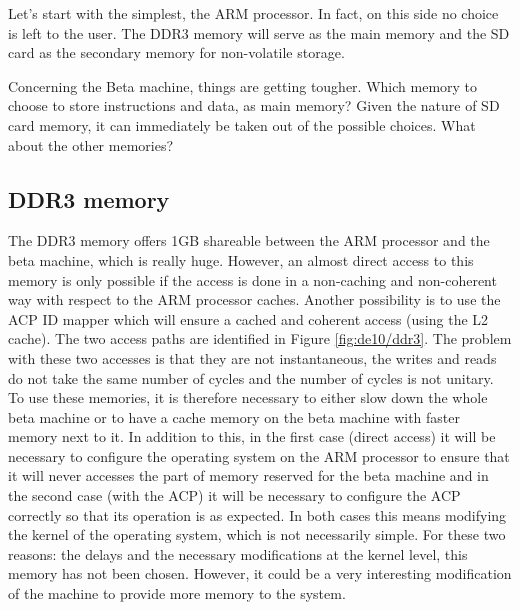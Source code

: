 Let's start with the simplest, the ARM processor. In fact, on this side no choice is left to the 
user. The DDR3 memory will serve as the main memory and the SD card as the secondary memory for 
non-volatile storage. 

Concerning the Beta machine, things are getting tougher.  Which memory to choose to store 
instructions and data, as main memory? Given the nature of SD card memory, it can immediately be 
taken out of the possible choices. What about the other memories?

\subsection{DDR3 memory}

The DDR3 memory offers 1GB 
shareable between the ARM processor and the beta machine, which is really huge. However, an almost 
direct access to this memory is only possible if the access is done in a non-caching and 
non-coherent way with respect to the ARM processor caches. Another possibility is to use the ACP 
ID mapper which will ensure a cached and coherent access (using the L2 cache). The two access paths 
are identified in Figure \ref{fig:de10/ddr3}. The problem with these two accesses is that they are 
not instantaneous, the writes and reads do not take the same number of cycles and the number of 
cycles is not unitary. To use these memories, it is therefore necessary to either slow down the 
whole beta machine or to have a cache memory on the beta machine with faster memory next to it. In 
addition to this, in the first case (direct access) it will be necessary to configure the operating 
system on the ARM processor to ensure that it will never accesses the part of memory reserved for the
beta machine and in the second case (with the ACP) it will be necessary to configure the ACP 
correctly so that its operation is as expected. In both cases this means modifying the kernel of the 
operating system, which is not necessarily simple. For these two reasons: the delays and the 
necessary modifications at the kernel level, this memory has not been chosen. However, it could be 
a very interesting modification of the machine to provide more memory to the system.

